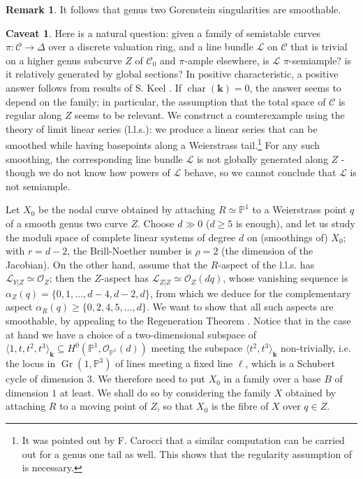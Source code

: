 \documentclass[11pt]{amsart}
\newcommand{\PP}{\mathbb P}
\renewcommand{\k}{\mathbf k}
\newcommand{\OO}{\mathcal O}
\renewcommand{\to}{\rightarrow}
\newcommand{\dvr}{\Delta}
\theoremstyle{plain}
\theoremstyle{definition}
\newtheorem*{caveat}{Caveat}
\newtheorem{rem}[thm]{Remark}
\begin{document}
\begin{rem}
 It follows that genus two Gorenstein singularities are smoothable.
\end{rem}

\begin{caveat} Here is a natural question: given a family of semistable curves $\pi\colon\mathcal C\to\dvr$ over a discrete valuation ring, and a line bundle $\mathcal L$ on $\mathcal C$ that is trivial on a higher genus subcurve $Z$ of $\mathcal C_0$ and $\pi$-ample elsewhere, is $\mathcal L$ $\pi$-semiample? is it relatively generated by global sections? In positive characteristic, a positive answer follows from results of S. Keel \cite{Keel-bpf}. If $\operatorname{char}(\k)=0$, the answer seems to depend on the family; in particular, the assumption that the total space of $\mathcal C$ is regular along $Z$ seems to be relevant. We construct a counterexample using the theory of limit linear series (l.l.s.): we produce a linear series that can be smoothed while having basepoints along a Weierstrass tail.\footnote{It was pointed out by F. Carocci that a similar computation can be carried out for a genus one tail as well. This shows that the regularity assumption of \cite[Lemma 2.13]{SMY1} is necessary.} For any such smoothing, the corresponding line bundle $\mathcal L$ is not globally generated along $Z$ - though we do not know how powers of $\mathcal L$ behave, so we cannot conclude that $\mathcal L$ is not semiample.
 
 Let $X_0$ be the nodal curve obtained by attaching $R\simeq\PP^1$ to a Weierstrass point $q$ of a smooth genus two curve $Z$. Choose $d\gg 0$ ($d\geq5$ is enough), and let us study the moduli space of complete linear systems of degree $d$ on (smoothings of) $X_0$; with $r=d-2$, the Brill-Noether number is $\rho=2$ (the dimension of the Jacobian). On the other hand, assume that the $R$-aspect of the l.l.s. has $\mathcal L_{Y|Z}\simeq\OO_Z$; then the $Z$-aspect has $\mathcal L_{Z|Z}\simeq\OO_Z(dq)$, whose vanishing sequence is $\alpha_Z(q)=\{0,1,\ldots,d-4,d-2,d\}$, from which we deduce for the complementary aspect $\alpha_R(q)\geq\{0,2,4,5,\ldots,d\}$. We want to show that all such aspects are smoothable, by appealing to the Regeneration Theorem \cite[Theorem 5.41]{HM}. Notice that in the case at hand we have a choice of a two-dimensional subspace of $\langle 1,t,t^2,t^3\rangle_\k\subseteq H^0(\PP^1,\OO_{\PP^1}(d))$ meeting the subspace $\langle t^2,t^3\rangle_\k$ non-trivially, i.e. the locus in $\operatorname{Gr}(1,\PP^3)$ of lines meeting a fixed line $\ell$, which is a Schubert cycle of dimension $3$. We therefore need to put $X_0$ in a family over a base $B$ of dimension $1$ at least.  We shall do so by considering the family $X$ obtained by attaching $R$ to a moving point of $Z$, so that $X_0$ is the fibre of $X$ over $q\in Z$.
 

\end{caveat}
\end{document}
